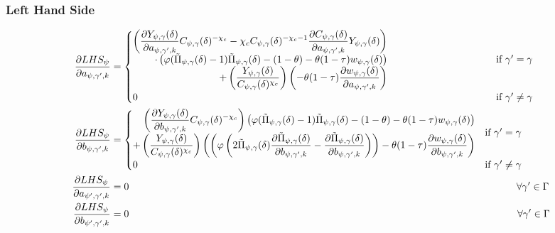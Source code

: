 \documentclass[11pt]{article}
\begin{document}
\subsubsection*{Left Hand Side}
\begin{align}
\frac{\partial LHS_{\psi}}{\partial a_{\psi,\gamma',k}} &=
\begin{cases}
\begin{aligned}
\left(\frac{\partial Y_{\psi,\gamma}(\delta)}{\partial a_{\psi,\gamma',k}}C_{\psi,\gamma}(\delta)^{-\chi_c} - \chi_cC_{\psi,\gamma}(\delta)^{-\chi_c - 1}\frac{\partial C_{\psi,\gamma}(\delta)}{\partial a_{\psi,\gamma',k}}Y_{\psi,\gamma}(\delta)\right) \\
\cdot \left(\varphi (\tilde{\Pi}_{\psi,\gamma}(\delta) - 1)\tilde{\Pi}_{\psi,\gamma}(\delta) - (1 - \theta) - \theta (1-\tau)w_{\psi,\gamma}(\delta)\right)\\
+ \left(\frac{Y_{\psi,\gamma}(\delta)}{C_{\psi,\gamma}(\delta)^{\chi_{c}}}\right)\left(- \theta (1-\tau)\frac{\partial w_{\psi,\gamma}(\delta)}{\partial a_{\psi,\gamma',k}}\right)
\end{aligned} & \hspace{3.5cm}\text{if } \gamma' = \gamma \\
0 & \hspace{3.5cm}\text{if } \gamma' \neq \gamma
\end{cases}\\
\frac{\partial LHS_{\psi}}{\partial b_{\psi,\gamma',k}} &=
\begin{cases}
\begin{aligned}
\left(\frac{\partial Y_{\psi,\gamma}(\delta)}{\partial b_{\psi,\gamma',k}}C_{\psi,\gamma}(\delta)^{-\chi_c}\right)\left(\varphi (\tilde{\Pi}_{\psi,\gamma}(\delta) - 1)\tilde{\Pi}_{\psi,\gamma}(\delta) - (1 - \theta) - \theta (1-\tau)w_{\psi,\gamma}(\delta)\right) \\
+ \left(\frac{Y_{\psi,\gamma}(\delta)}{C_{\psi,\gamma}(\delta)^{\chi_{c}}}\right)\left(\left(\varphi\left(2\tilde{\Pi}_{\psi,\gamma}(\delta)\frac{\partial \tilde{\Pi}_{\psi,\gamma}(\delta)}{\partial b_{\psi,\gamma',k}} - \frac{\partial \tilde{\Pi}_{\psi,\gamma}(\delta)}{\partial b_{\psi,\gamma',k}}\right)\right) - \theta (1-\tau)\frac{\partial w_{\psi,\gamma}(\delta)}{\partial b_{\psi,\gamma',k}}\right)
\end{aligned}& \text{if } \gamma' = \gamma \\
0 & \text{if } \gamma' \neq \gamma
\end{cases}\\
\frac{\partial LHS_{\psi}}{\partial a_{\psi',\gamma',k}} &= 0 \hspace{13.72cm} \forall \gamma'\in\Gamma\\
\frac{\partial LHS_{\psi}}{\partial b_{\psi',\gamma',k}} &= 0 \hspace{13.75cm} \forall \gamma'\in\Gamma
\end{align}
\end{document}
